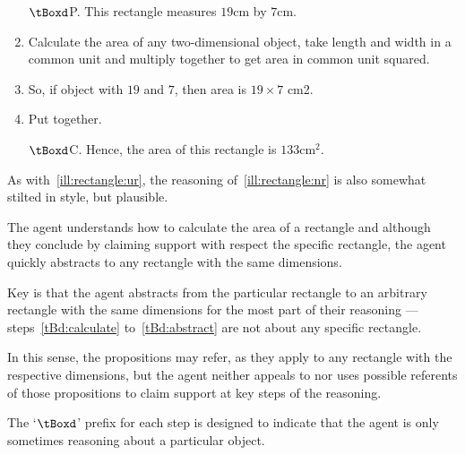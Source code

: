 \begin{note}[]
  \begin{illustration}\label{ill:rectangle:nr}
    \vspace{-\baselineskip}
    \begin{enumerate}[label=\(\protect\tBoxd\)\space\arabic*., ref=(\(\protect\tBoxd\)\space\arabic*), align=left, leftmargin=*]
    \item[\(\protect\tBoxd\)\space P.]\label{tBd:measure} This rectangle measures \(19\text{cm}\) by \(7\text{cm}\).
    \item\label{tBd:calculate} Calculate the area of any two-dimensional object, take length and width in a common unit and multiply together to get area in common unit squared.
    \item\label{tBd:abstract} So, if object with \(19\) and \(7\), then area is \(19 \times 7\) cm2.
    \item\label{tBd:instantiate} Put together.
    \item[\(\protect\tBoxd\)\space C.]\label{tBd:conclusion} Hence, the area of this rectangle is \(133\text{cm}^{2}\).
    \end{enumerate}
    \vspace{-\baselineskip}
  \end{illustration}

  As with~\autoref{ill:rectangle:ur}, the reasoning of~\autoref{ill:rectangle:nr} is also somewhat stilted in style, but plausible.

  The agent understands how to calculate the area of a rectangle and although they conclude by claiming support with respect the specific rectangle, the agent quickly abstracts to any rectangle with the same dimensions.

  Key is that the agent abstracts from the particular rectangle to an arbitrary rectangle with the same dimensions for the most part of their reasoning --- steps~\ref{tBd:calculate} to~\ref{tBd:abstract} are not about any specific rectangle.

  In this sense, the propositions may refer, as they apply to any rectangle with the respective dimensions, but the agent neither appeals to nor uses possible referents of those propositions to claim support at key steps of the reasoning.

  The `\(\tBoxd\)' prefix for each step is designed to indicate that the agent is only sometimes reasoning about a particular object.
\end{note}


